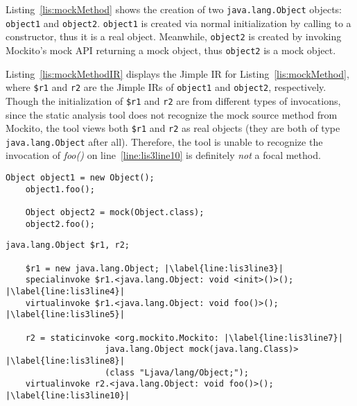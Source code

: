 Listing~\ref{lis:mockMethod} shows the creation of two \texttt{java.lang.Object} objects: \texttt{object1} and \texttt{object2}. \texttt{object1} is created via normal initialization by calling to a constructor, thus it is a real object. Meanwhile, \texttt{object2} is created by invoking Mockito's mock API returning a mock object, thus \texttt{object2} is a mock object.

Listing~\ref{lis:mockMethodIR} displays the Jimple IR for Listing~\ref{lis:mockMethod}, where \texttt{\$r1} and \texttt{r2} are the Jimple IRs of \texttt{object1} and \texttt{object2}, respectively. Though the initialization of \texttt{\$r1} and \texttt{r2} are from different types of invocations, since the static analysis tool does not recognize the mock source method from Mockito, the tool views both \texttt{\$r1} and \texttt{r2} as real objects (they are both of type \texttt{java.lang.Object} after all). Therefore, the tool is unable to recognize the invocation of \textit{foo()} on line~\ref{line:lis3line10} is definitely \textit{not} a focal method.

\begin{lstlisting}[basicstyle=\ttfamily, caption={A toy example illustrates a real object \texttt{object1} and a mock object \texttt{object2}, and their corresponding method invocations of \textit{foo()}.},
basicstyle=\ttfamily, captionpos=b, label=lis:mockMethod, escapechar=|, morekeywords={@Test, specialinvoke, virtualinvoke, staticinvoke}]
	Object object1 = new Object();
	object1.foo();
	
	Object object2 = mock(Object.class);
	object2.foo();
\end{lstlisting}



\begin{lstlisting}[basicstyle=\ttfamily, caption={Jimple Intermediate Representation for the code in Listing~\ref{lis:mockMethod}.},
basicstyle=\ttfamily, captionpos=b, label=lis:mockMethodIR, escapechar=|, morekeywords={@Test, specialinvoke, virtualinvoke, staticinvoke}]
	java.lang.Object $r1, r2;
	
	$r1 = new java.lang.Object; |\label{line:lis3line3}|
	specialinvoke $r1.<java.lang.Object: void <init>()>(); |\label{line:lis3line4}|
	virtualinvoke $r1.<java.lang.Object: void foo()>(); |\label{line:lis3line5}|
	
	r2 = staticinvoke <org.mockito.Mockito: |\label{line:lis3line7}|
					java.lang.Object mock(java.lang.Class)> |\label{line:lis3line8}|
					(class "Ljava/lang/Object;");
	virtualinvoke r2.<java.lang.Object: void foo()>(); |\label{line:lis3line10}|
\end{lstlisting}


